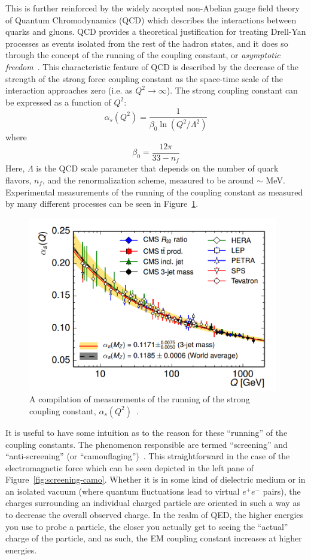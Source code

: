 This is further reinforced by the widely accepted non-Abelian gauge field theory of Quantum Chromodynamics (QCD) which describes the interactions between quarks and gluons. QCD provides a theoretical justification for treating Drell-Yan processes as events isolated from the rest of the hadron states, and it does so through the concept of the running of the coupling constant, or \emph{asymptotic freedom}~\cite{Bethke:2006ac}. This characteristic feature of QCD is described by the decrease of the strength of the strong force coupling constant as the space-time scale of the interaction approaches zero (i.e. as $Q^2 \rightarrow \infty$). The strong coupling constant can be expressed as a function of $Q^2$:
\begin{equation}
\alpha_s(Q^2) = \frac{1}{\beta_0 \ln (Q^2/\Lambda^2)}
\end{equation}
where
\begin{equation}
\beta_0 = \frac{12\pi}{33-n_f}
\end{equation}
Here, $\Lambda$ is the QCD scale parameter that depends on the number of quark flavors, $n_f$, and the renormalization scheme, measured to be around $\sim$ \unit[217]{MeV}. Experimental measurements of the running of the coupling constant as measured by many different processes can be seen in Figure~\ref{fig:asymptotic-freedom}.
\begin{figure}
	\centering
	\includegraphics[height=3in]{figures/background/running-strong-coupling.png}
	\caption{A compilation of measurements of the running of the strong coupling constant, $\alpha_s(Q^2)$~\cite{CMS:2014mna}.}
	\label{fig:asymptotic-freedom}
\end{figure}

It is useful to have some intuition as to the reason for these ``running'' of the coupling constants. The phenomenon responsible are termed ``screening'' and ``anti-screening'' (or ``camouflaging'')~\cite{Quigg:1985ai}. This straightforward in the case of the electromagnetic force which can be seen depicted in the left pane of Figure~\ref{fig:screening-camo}. Whether it is in some kind of dielectric medium or in an isolated vacuum (where quantum fluctuations lead to virtual $e^+e^-$ pairs), the charges surrounding an individual charged particle are oriented in such a way as to decrease the overall observed charge. In the realm of QED, the higher energies you use to probe a particle, the closer you actually get to seeing the ``actual'' charge of the particle, and as such, the EM coupling constant increases at higher energies.

